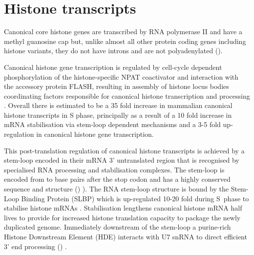\section{Histone transcripts}
  
	Canonical core histone genes are transcribed by RNA polymerase II 
	and have a methyl guanosine cap 
	but, unlike almost all other protein coding genes including histone variants, 
	they do not have introns and are not polyadenylated ().

	Canonical histone gene transcription is regulated 
	by cell-cycle dependent phosphorylation of the histone-specific NPAT coactivator 
	and interaction with the accessory protein FLASH, 
	resulting in assembly of histone locus bodies 
	coordinating factors responsible for canonical histone transcription and processing .
	Overall there is estimated to be a 35 fold increase in mammalian canonical histone transcripts in S phase,
	principally as a result of a 10 fold increase in mRNA stabilisation via stem-loop dependent mechanisms 
	and a 3-5 fold up-regulation in canonical histone gene transcription. 

	This post-translation regulation of canonical histone transcripts 
	is achieved by a stem-loop encoded in their mRNA 3' untranslated region 
	that is recognised by specialised RNA processing and stabilisation complexes.
	The stem-loop is encoded from \StemLoopStart{} to \StemLoopEnd{} base pairs after the stop codon 
	and has a highly conserved sequence and structure () \citep{stem-loop-structure}).
	The RNA stem-loop structure is bound by the Stem-Loop Binding Protein (SLBP) 
	which is up-regulated 10-20 fold during S~phase to stabilise histone mRNAs \citep{SLBP-regulation}. 
	Stabilisation lengthens canonical histone mRNA half lives 
	to provide for increased histone translation capacity to package the newly duplicated genome.
	Immediately downstream of the stem-loop a purine-rich Histone Downstream Element (HDE) 
	 interacts with U7 snRNA to direct efficient 3' end processing () \citep{HDE-sequence}.

